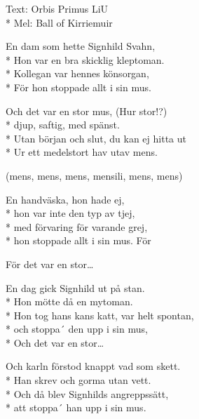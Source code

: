 \begin{SongText}
\begin{SongInfo}
    Text: Orbis Primus LiU\\*%
    Mel: Ball of Kirriemuir
\end{SongInfo}
\begin{SongVerse}
En dam som hette Signhild Svahn,\\*%
Hon var en bra skicklig kleptoman.\\*%
Kollegan var hennes könsorgan,\\*%
För hon stoppade allt i sin mus. 
\end{SongVerse}
\begin{SongVerse}
Och det var en stor mus, (Hur stor!?)\\*%
djup, saftig, med spänst.\\*%
Utan början och slut, du kan ej hitta ut\\*%
Ur ett medelstort hav utav mens.
\end{SongVerse}
\begin{SongVerse}
(mens, mens, mens, mensili, mens, mens)
\end{SongVerse}
\begin{SongVerse}
En handväska, hon hade ej,\\*%
hon var inte den typ av tjej,\\*%
med förvaring för varande grej,\\*%
hon stoppade allt i sin mus. För
\end{SongVerse}
\begin{SongVerse}
För det var en stor…
\end{SongVerse}
\begin{SongVerse}
En dag gick Signhild ut på stan.\\*%
Hon mötte då en mytoman.\\*%
Hon tog hans kans katt, var helt spontan,\\*%
och stoppa´ den upp i sin mus,\\*%
Och det var en stor…
\end{SongVerse}
\begin{SongVerse}
Och karln förstod knappt vad som skett.\\*%
Han skrev och gorma utan vett.\\*%
Och då blev Signhilds angreppssätt,\\*%
att stoppa´ han upp i sin mus.
\end{SongVerse}
\begin{SongVerse}

\end{SongVerse}
\end{SongText}
